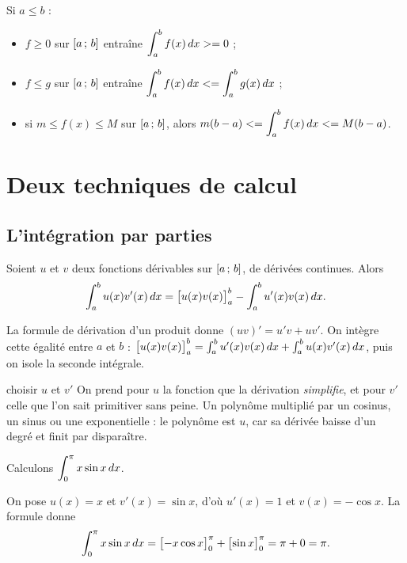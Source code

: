 \begin{propriete}
Si $a \leq b$ :
\begin{itemize}[leftmargin=1.4em, itemsep=0.18em]
  \item $f \geq 0$ sur $\left[a\,;\,b\right]$ entraîne $\displaystyle\int_{a}^{b} f(x)\,dx >= 0$ ;
  \item $f \leq g$ sur $\left[a\,;\,b\right]$ entraîne
        $\displaystyle\int_{a}^{b} f(x)\,dx <= \int_{a}^{b} g(x)\,dx$ ;
  \item si $m \leq f(x) \leq M$ sur $\left[a\,;\,b\right]$, alors
        $m(b-a) <= \displaystyle\int_{a}^{b} f(x)\,dx <= M(b-a)$.
\end{itemize}
\end{propriete}

\section{Deux techniques de calcul}

\subsection{L'intégration par parties}

\begin{theoreme}
Soient $u$ et $v$ deux fonctions dérivables sur $\left[a\,;\,b\right]$, de
dérivées continues. Alors
\[
  \int_{a}^{b} u(x)v'(x)\,dx
  = \bigl[u(x)v(x)\bigr]_{a}^{b} - \int_{a}^{b} u'(x)v(x)\,dx .
\]
\end{theoreme}

\begin{demonstration}
La formule de dérivation d'un produit donne $(uv)' = u'v + uv'$. On intègre
cette égalité entre $a$ et $b$ :
$\bigl[u(x)v(x)\bigr]_{a}^{b} = \int_{a}^{b} u'(x)v(x)\,dx + \int_{a}^{b} u(x)v'(x)\,dx$,
puis on isole la seconde intégrale.
\end{demonstration}

\begin{methode}{choisir $u$ et $v'$}
On prend pour $u$ la fonction que la dérivation \emph{simplifie}, et pour
$v'$ celle que l'on sait primitiver sans peine. Un polynôme multiplié par un
cosinus, un sinus ou une exponentielle : le polynôme est $u$, car sa dérivée
baisse d'un degré et finit par disparaître.
\end{methode}

\begin{exemple}
Calculons $\displaystyle\int_{0}^{\pi} x\sin x \,dx$.

On pose $u(x) = x$ et $v'(x) = \sin x$, d'où $u'(x) = 1$ et
$v(x) = -\cos x$. La formule donne
\[
  \int_{0}^{\pi} x\sin x \,dx
  = \bigl[-x\cos x\bigr]_{0}^{\pi} + \bigl[\sin x\bigr]_{0}^{\pi}
  = \pi + 0 = \pi .
\]
\end{exemple}

